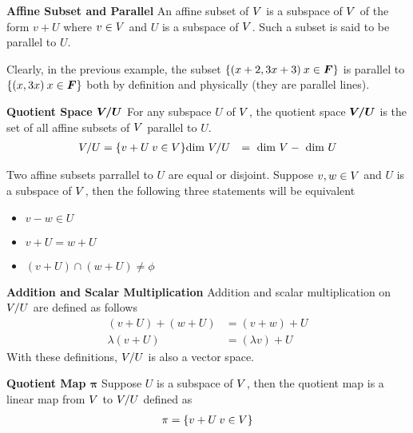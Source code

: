 \documentclass[../../linear_algebra.tex]{subfiles}
\begin{document}
\textbf{Affine Subset and Parallel}\newline
An affine subset of $V$ is a subspace of $V$ of the form $v + U$ where $v \in V$ and $U$ is a subspace of $V$. Such a subset is said to be parallel to $U$.\newline

Clearly, in the previous example, the subset $\{(x + 2, 3x + 3) \: x \in \bm{F} \}$ is parallel to $\{(x, 3x) \: x \in \bm{F} \}$ both by definition and physically (they are parallel lines).\newline

\textbf{Quotient Space $\bm{V/U}$}\newline
For any subspace $U$ of $V$, the quotient space $\bm{V/U}$ is the set of all affine subsets of $V$ parallel to $U$.
\begin{align*}
    V/U &= \{ v + U \: v \in V \}
    \text{dim } V/U &= \text{ dim } V - \text{ dim } U
\end{align*}

Two affine subsets parrallel to $U$ are equal or disjoint. Suppose $v, w \in V$ and $U$ is a subspace of $V$, then the following three statements will be equivalent
\begin{itemize}
    \item $v - w \in U$
    \item $v + U = w + U$
    \item $(v + U) \cap (w + U) \neq \phi$
\end{itemize}

\textbf{Addition and Scalar Multiplication}\newline
Addition and scalar multiplication on $V/U$ are defined as follows
\begin{align*}
    (v + U) + (w + U) &= (v + w) + U\\
    \lambda(v + U) &= (\lambda v) + U
\end{align*}
With these definitions, $V/U$ is also a vector space.\newline

\textbf{Quotient Map $\bm{\pi}$}
Suppose $U$ is a subspace of $V$, then the quotient map is a linear map from $V$ to $V/U$ defined as
\begin{align*}
    \pi = \{ v + U \: v \in V \}
\end{align*}
\end{document}
